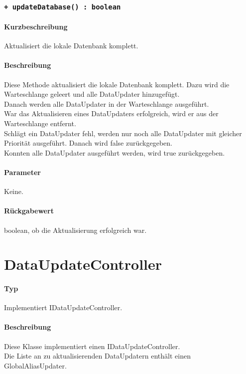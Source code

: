 \subsubsection{\texttt{+ updateDatabase() : boolean}}%
\paragraph*{Kurzbeschreibung}
Aktualisiert die lokale Datenbank komplett.
\paragraph*{Beschreibung}
Diese Methode aktualisiert die lokale Datenbank komplett. 
Dazu wird die Warteschlange geleert und alle DataUpdater hinzugefügt.\\
Danach werden alle DataUpdater in der Warteschlange ausgeführt.\\
War das Aktualisieren eines DataUpdaters erfolgreich, wird er aus der Warteschlange entfernt.\\
Schlägt ein DataUpdater fehl, werden nur noch alle DataUpdater mit gleicher Priorität 
ausgeführt. Danach wird false zurückgegeben.\\
Konnten alle DataUpdater ausgeführt werden, wird true zurückgegeben.
\paragraph*{Parameter}
Keine.
\paragraph*{Rückgabewert}
boolean, ob die Aktualisierung erfolgreich war.

\section{DataUpdateController}
\paragraph*{Typ}
Implementiert IDataUpdateController.
\paragraph*{Beschreibung}
Diese Klasse implementiert einen IDataUpdateController.\\
Die Liste an zu aktualisierenden DataUpdatern enthält einen GlobalAliasUpdater.